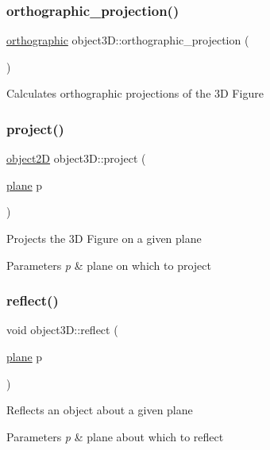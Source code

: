 \subsubsection{\texorpdfstring{orthographic\+\_\+projection()}{orthographic\_projection()}}
{\footnotesize\ttfamily \mbox{\hyperlink{classorthographic}{orthographic}} object3\+D\+::orthographic\+\_\+projection (\begin{DoxyParamCaption}{ }\end{DoxyParamCaption})}

Calculates orthographic projections of the 3D Figure \mbox{\label{classobject3D_a4b7bdf9d5a609b34e1ca22490538a37d}} 
\subsubsection{\texorpdfstring{project()}{project()}}
{\footnotesize\ttfamily \mbox{\hyperlink{classobject2D}{object2D}} object3\+D\+::project (\begin{DoxyParamCaption}\item[{\mbox{\hyperlink{classplane}{plane}}}]{p }\end{DoxyParamCaption})}

Projects the 3D Figure on a given plane 
\begin{DoxyParams}{Parameters}
{\em p} & plane on which to project \\
\hline
\end{DoxyParams}
\mbox{\label{classobject3D_a63af641d18acc59e4ff0cae8387b06bc}} 
\subsubsection{\texorpdfstring{reflect()}{reflect()}}
{\footnotesize\ttfamily void object3\+D\+::reflect (\begin{DoxyParamCaption}\item[{\mbox{\hyperlink{classplane}{plane}}}]{p }\end{DoxyParamCaption})}

Reflects an object about a given plane 
\begin{DoxyParams}{Parameters}
{\em p} & plane about which to reflect \\
\hline
\end{DoxyParams}
\mbox{\label{classobject3D_a9599c3e6c9ea35b9496d4b5b14623b5b}} 
